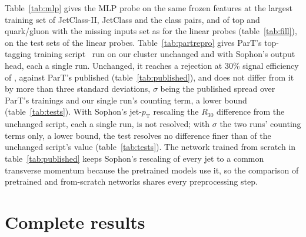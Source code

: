 Table~\ref{tab:mlp} gives the MLP probe on the same frozen features at the largest training set of JetClass-II,
JetClass and the class pairs, and of top and quark/gluon with the missing inputs set as for the linear probes
(table~\ref{tab:fill}), on the test sets of the linear probes. Table~\ref{tab:partrepro} gives ParT's top-tagging training script~\cite{part} run on our
cluster unchanged and with Sophon's output head, each a single run. Unchanged, it
reaches a rejection at 30\% signal efficiency of \MlstPartreproRthirtyPart, against ParT's published
\LitPartTopRejScratch{} (table~\ref{tab:published}), and does not differ from it by more than three
standard deviations, $\sigma$ being the published spread over ParT's trainings and our single run's counting term,
a lower bound (table~\ref{tab:tests}). With Sophon's jet-$p_{\mathrm{T}}$ rescaling the $R_{30}$ difference from the
unchanged script, each a single run, is not resolved; with $\sigma$ the two runs' counting terms only, a lower bound,
the test resolves no difference finer than \MlstPwPartRescale{} of the unchanged script's value
(table~\ref{tab:tests}). The network trained from scratch in
table~\ref{tab:published} keeps Sophon's rescaling of every jet to a common transverse momentum because the
pretrained models use it, so the comparison of pretrained and from-scratch networks shares every preprocessing
step.







\section{Complete results}\label{sec:app-results}\label{sec:app-all}\label{sec:app-tests}\label{sec:app-coarse}
\label{sec:app-jetclass}\label{sec:app-pairs}\label{sec:app-mass}


